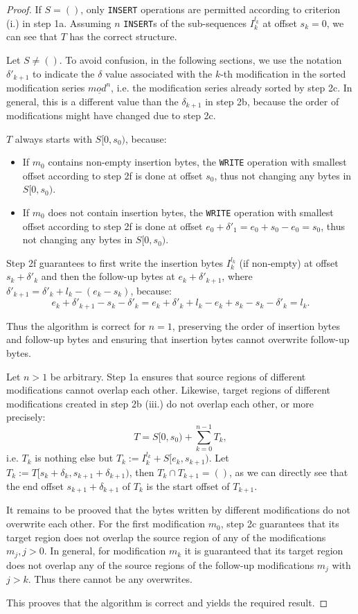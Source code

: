 \documentclass[english, 10pt, openright, twocolumn, landscape, twoside, notitlepage, a4paper, pdftex]		
{article}
\begin{document}
\begin{proof}
If $S=()$, only \texttt{INSERT} operations are permitted according to criterion (i.) in step 1a. Assuming $n$ \texttt{INSERT}s of the sub-sequences $I_{k}^{l_{k}}$ at offset $s_{k}=0$, we can see that $T$ has the correct structure.

Let $S\neq()$. To avoid confusion, in the following sections, we use the notation $\delta'_{k+1}$ to indicate the $\delta$ value associated with the $k$-th modification in the sorted modification series $\underline{mod^{n}}$, i.e. the modification series already sorted by step 2c. In general, this is a different value than the $\delta_{k+1}$ in step 2b, because the order of modifications might have changed due to step 2c.

$T$ always starts with $S[0,s_{0})$, because:
\begin{itemize}
\item If $m_{0}$ contains non-empty insertion bytes, the \texttt{WRITE} operation with smallest offset according to step 2f is done at offset $s_{0}$, thus not changing any bytes in $S[0,s_{0})$.
\item If $m_{0}$ does not contain insertion bytes, the \texttt{WRITE} operation with smallest offset according to step 2f is done at offset $e_{0}+\delta'_{1}=e_{0}+s_{0}-e_{0}=s_{0}$, thus not changing any bytes in $S[0,s_{0})$.
\end{itemize}

Step 2f guarantees to first write the insertion bytes $I_{k}^{l_{k}}$ (if non-empty) at offset $s_{k}+\delta'_{k}$ and then the follow-up bytes at $e_{k}+\delta'_{k+1}$, where $\delta'_{k+1}=\delta'_{k}+l_{k}-(e_{k}-s_{k})$, because:
\[e_{k}+\delta'_{k+1}-s_{k}-\delta'_{k}=e_{k}+\delta'_{k}+l_{k}-e_{k}+s_{k}-s_{k}-\delta'_{k}=l_{k}.\]

Thus the algorithm is correct for $n=1$, preserving the order of insertion bytes and follow-up bytes and ensuring that insertion bytes cannot overwrite follow-up bytes.

Let $n>1$ be arbitrary. Step 1a ensures that source regions of different modifications cannot overlap each other. Likewise, target regions of different modifications created in step 2b (iii.) do not overlap each other, or more precisely: 
\[T=S[0,s_{0})+\sum_{k=0}^{n-1}{T_{k}},\]
i.e. $T_{k}$ is nothing else but $T_{k}:=I_{k}^{l_{k}}+S[e_{k},s_{k+1})$. Let $T_{k}:=T[s_{k}+\delta_{k},s_{k+1}+\delta_{k+1})$, then $T_{k}\cap T_{k+1} = ()$, as we can directly see that the end offset $s_{k+1}+\delta_{k+1}$ of $T_{k}$ is the start offset of $T_{k+1}$.

It remains to be prooved that the bytes written by different modifications do not overwrite each other. For the first modification $m_{0}$, step 2c guarantees that its target region does not overlap the source region of any of the modifications $m_{j},j>0$. In general, for modification $m_{k}$ it is guaranteed that its target region does not overlap any of the source regions of the follow-up modifications $m_{j}$ with $j>k$. Thus there cannot be any overwrites.

This prooves that the algorithm is correct and yields the required result.\end{proof}
\end{document}
